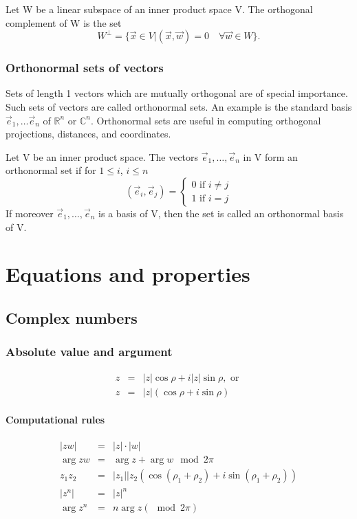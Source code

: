 \documentclass{article}
\begin{document}
		Let W be a linear subspace of an inner product space V. The orthogonal complement of W is the set
		\begin{equation*}
			W^\bot = \{\vec{x}\in V | (\vec{x},\vec{w}) = 0 \quad \forall \vec{w} \in W\}.
		\end{equation*}
		
		\subsubsection{Orthonormal sets of vectors}
		Sets of length 1 vectors which are mutually orthogonal are of special importance. Such sets of vectors are called orthonormal sets. An example is the standard basis $\vec{e}_1,\dots\vec{e}_n$ of $\mathbb{R}^n$ or $\mathbb{C}^n$. Orthonormal sets are useful in computing orthogonal projections, distances, and coordinates.
		
		Let V be an inner product space. The vectors $\vec{e}_1,\dots,\vec{e}_n$ in V form an orthonormal set if for $1 \leq i$, $i\leq n$
		  \[
				(\vec{e}_i,\vec{e}_j)=\left\{
					\begin{array}{ll}
						0 \text{ if } i \neq j \\
						1 \text{ if } i = j 
					\end{array}
				\right.
		\]
		If moreover $\vec{e}_1,\dots,\vec{e}_n$ is a basis of V, then the set is called an orthonormal basis of V.
		
	\section{Equations and properties}
		\subsection{Complex numbers}
			\subsubsection{Absolute value and argument}
			\begin{eqnarray*}
				z &=& |z|\cos{\rho} + i|z|\sin{\rho}, \text{ or } \\
				z &=& |z|(\cos{\rho} + i\sin{\rho})
			\end{eqnarray*}
		
			\paragraph{Computational rules}
			\begin{eqnarray*}
				|zw| &=& |z| \cdot |w| \\
				\arg{zw} &=& \arg{z} + \arg{w} \mod{2\pi}\\
				z_1z_2 &=& |z_1||z_2(\cos{(\rho_1+\rho_2) + i\sin{(\rho_1+\rho_2)}}) \\
				|z^n| &=& |z|^n \\
				\arg{z^n} &=& n\arg{z} (\mod{2\pi})
			\end{eqnarray*}
		
\end{document}
